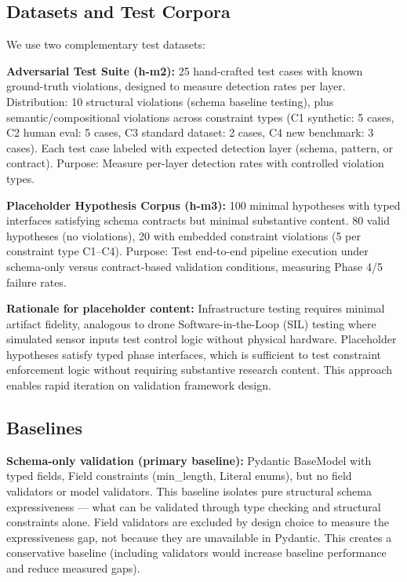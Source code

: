 \subsection{Datasets and Test Corpora}

We use two complementary test datasets:

\textbf{Adversarial Test Suite (h-m2):} 25 hand-crafted test cases with known ground-truth violations, designed to measure detection rates per layer. Distribution: 10 structural violations (schema baseline testing), plus semantic/compositional violations across constraint types (C1 synthetic: 5 cases, C2 human eval: 5 cases, C3 standard dataset: 2 cases, C4 new benchmark: 3 cases). Each test case labeled with expected detection layer (schema, pattern, or contract). Purpose: Measure per-layer detection rates with controlled violation types.

\textbf{Placeholder Hypothesis Corpus (h-m3):} 100 minimal hypotheses with typed interfaces satisfying schema contracts but minimal substantive content. 80 valid hypotheses (no violations), 20 with embedded constraint violations (5 per constraint type C1--C4). Purpose: Test end-to-end pipeline execution under schema-only versus contract-based validation conditions, measuring Phase 4/5 failure rates.

\textbf{Rationale for placeholder content:} Infrastructure testing requires minimal artifact fidelity, analogous to drone Software-in-the-Loop (SIL) testing where simulated sensor inputs test control logic without physical hardware. Placeholder hypotheses satisfy typed phase interfaces, which is sufficient to test constraint enforcement logic without requiring substantive research content. This approach enables rapid iteration on validation framework design.

\subsection{Baselines}

\textbf{Schema-only validation (primary baseline):} Pydantic BaseModel with typed fields, Field constraints (min\_length, Literal enums), but no field validators or model validators. This baseline isolates pure structural schema expressiveness --- what can be validated through type checking and structural constraints alone. Field validators are excluded by design choice to measure the expressiveness gap, not because they are unavailable in Pydantic. This creates a conservative baseline (including validators would increase baseline performance and reduce measured gaps).

